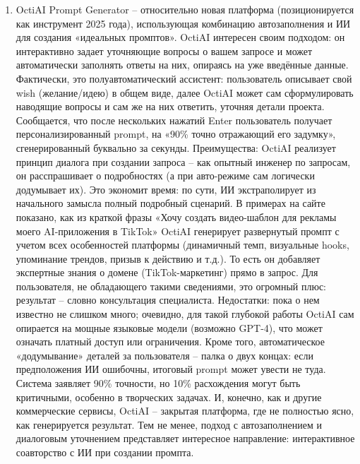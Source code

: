 \begin{enumerate}[label=\arabic*.]
\item OctiAI Prompt Generator – относительно новая платформа (позиционируется как инструмент 2025 года), использующая комбинацию автозаполнения и ИИ для создания «идеальных промптов». OctiAI интересен своим подходом: он интерактивно задает уточняющие вопросы о вашем запросе и может автоматически заполнять ответы на них, опираясь на уже введённые данные\cite{octiai:2025}. Фактически, это полуавтоматический ассистент: пользователь описывает свой wish (желание/идею) в общем виде, далее OctiAI может сам сформулировать наводящие вопросы и сам же на них ответить, уточняя детали проекта. Сообщается, что после нескольких нажатий Enter пользователь получает персонализированный prompt, на «90\% точно отражающий его задумку», сгенерированный буквально за секунды\cite{octiai:2025}. Преимущества: OctiAI реализует принцип диалога при создании запроса – как опытный инженер по запросам, он расспрашивает о подробностях (а при авто-режиме сам логически додумывает их). Это экономит время: по сути, ИИ экстраполирует из начального замысла полный подробный сценарий. В примерах на сайте показано, как из краткой фразы «Хочу создать видео-шаблон для рекламы моего AI-приложения в TikTok» OctiAI генерирует развернутый промпт с учетом всех особенностей платформы (динамичный темп, визуальные hooks, упоминание трендов, призыв к действию и т.д.)\cite{octiai:2025}. То есть он добавляет экспертные знания о домене (TikTok-маркетинг) прямо в запрос. Для пользователя, не обладающего такими сведениями, это огромный плюс: результат – словно консультация специалиста. Недостатки: пока о нем известно не слишком много; очевидно, для такой глубокой работы OctiAI сам опирается на мощные языковые модели (возможно GPT-4), что может означать платный доступ или ограничения. Кроме того, автоматическое «додумывание» деталей за пользователя – палка о двух концах: если предположения ИИ ошибочны, итоговый prompt может увести не туда. Система заявляет 90\% точности, но 10\% расхождения могут быть критичными, особенно в творческих задачах. И, конечно, как и другие коммерческие сервисы, OctiAI – закрытая платформа, где не полностью ясно, как генерируется результат. Тем не менее, подход с автозаполнением и диалоговым уточнением представляет интересное направление: интерактивное соавторство с ИИ при создании промпта.
\end{enumerate}

